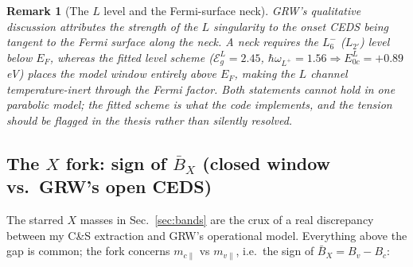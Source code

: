 \documentclass[11pt,a4paper]{article}
\numberwithin{equation}{section}
\newcommand{\EgL}{\mathcal{E}_g^{L}}
\newcommand{\Bb}{\bar{B}}
\newcommand{\Ezc}{E_{0c}}
\newtheorem{remark}{Remark}[section]
\begin{document}
\begin{remark}[The $L$ level and the Fermi-surface neck]\label{rem:neck}
GRW's qualitative discussion attributes the strength of the $L$
singularity to the onset CEDS being tangent to the Fermi surface along
the neck.  A neck requires the $L_6^-$ ($L_{2'}$) level \emph{below}
$E_F$, whereas the fitted level scheme
($\EgL=2.45$, $\hbar\omega_{L^+}=1.56\Rightarrow\Ezc^L=+0.89$ eV)
places the model window entirely above $E_F$, making the $L$ channel
temperature-inert through the Fermi factor.  Both statements cannot
hold in one parabolic model; the fitted scheme is what the code
implements, and the tension should be flagged in the thesis rather
than silently resolved.
\end{remark}

\subsection{The $X$ fork: sign of $\Bb_X$ (closed window vs.\ GRW's
open CEDS)}\label{sec:fork}

The starred $X$ masses in Sec.~\ref{sec:bands} are the crux of a real
discrepancy between my C\&S extraction and GRW's operational model.
Everything above the gap is common; the fork concerns
$m_{c\parallel}$ vs $m_{v\parallel}$, i.e.\ the sign of
$\Bb_X=B_v-B_c$:
\end{document}
